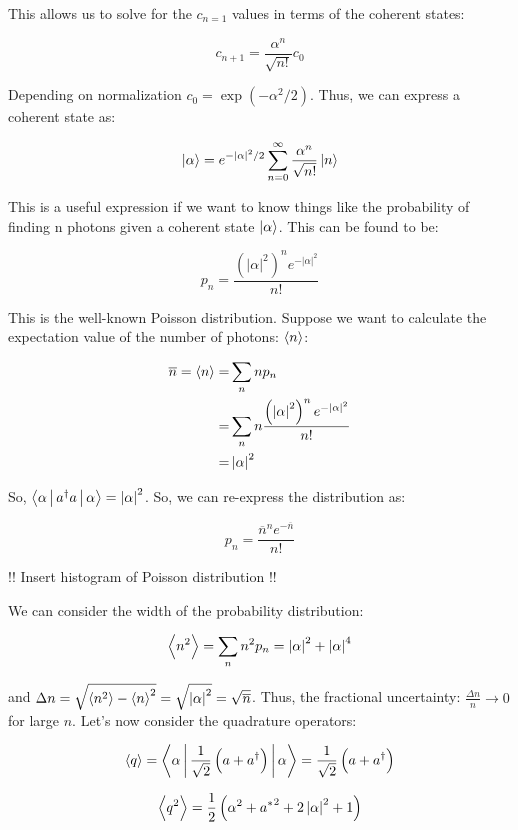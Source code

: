 \documentclass{article}
\begin{document}
This allows us to solve for the $ c_{n=1} $ values in terms of the coherent
states:

\[
   c_{n+1} = \frac{\alpha^n}{\sqrt{n!}} c_0
\]

Depending on normalization $ c_0 = \exp( -\alpha^2/2 ) $. Thus, we can express a
coherent state as:

\[
   \Ket{\alpha} = e^{-\left| \alpha \right|^2 / 2} \sum_{n=0}^\infty
   \frac{\alpha^n}{\sqrt{n!}} \Ket{n}
\]

This is a useful expression if we want to know things like the probability of
finding n photons given a coherent state $ \Ket{\alpha} $. This can be found to
be:

\[
   p_n = \frac{\left( \left| \alpha \right|^2 \right)^n e^{-\left| \alpha
   \right|^2} }{n!}
\]

This is the well-known Poisson distribution. Suppose we want to calculate the
expectation value of the number of photons: $ \Braket{n} $:

\begin{align*}
   \overline{n} = \Braket{n} =& \sum_n n p_n \\
   =& \sum_n n \frac{\left( \left| \alpha \right|^2 \right)^n e^{-\left|
\alpha \right|^2} }{n!} \\
=& \left| \alpha \right|^2
\end{align*}

So, $ \Braket{\alpha | a^\dagger a | \alpha} = \left| \alpha \right|^2 $. So,
we can re-express the distribution as:

\[
   p_n = \frac{\overline{n}^n e^{-\overline{n}} }{n!}
\]

!! Insert histogram of Poisson distribution !!

We can consider the width of the probability distribution:

\[
   \Braket{n^2} = \sum_n n^2 p_n = \left| \alpha \right|^2 + \left| \alpha
   \right|^4
\]

and $ \Delta n = \sqrt{\Braket{n^2}-\Braket{n}^2} = \sqrt{\left| \alpha
\right|^2} = \sqrt{\overline{n}} $. Thus, the fractional uncertainty: $
\frac{\Delta n}{n} \rightarrow 0 $ for large $ n $. Let's now consider the
quadrature operators:

\[
   \Braket{q} = \Braket{\alpha | \frac{1}{\sqrt{2}} \left( a + a^\dagger \right)
   | \alpha} = \frac{1}{\sqrt{2}} \left( a + a^\dagger \right)
\]

\[
   \Braket{q^2} = \frac{1}{2}\left( \alpha^2 + {a^*}^2 + 2 \left| \alpha
      \right|^2 + 1 \right)
\]
\end{document}
